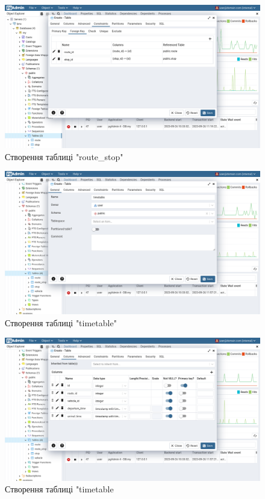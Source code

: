 \documentclass[14pt]{extreport}
\begin{document}
\begin{normalsize}
	\begin{figure}[H]
		\centering
		\includegraphics[scale=0.35]{29}
		\caption{Створення таблиці "route\_stop"}
	\end{figure}
	
	\begin{figure}[H]
		\centering
		\includegraphics[scale=0.35]{30}
		\caption{Створення таблиці "timetable"}
	\end{figure}
	
	\begin{figure}[H]
		\centering
		\includegraphics[scale=0.35]{31}
		\caption{Створення таблиці "timetable}
	\end{figure}
	

\end{normalsize}
\end{document}

